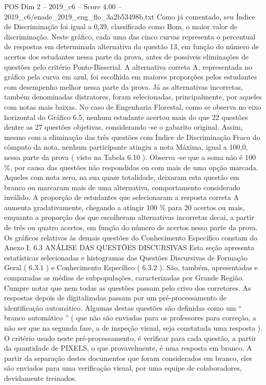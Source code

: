 \begin{textsample}{POS Dim 2 – 2019\_c6 – Score 4.00 – 2019\_c6/enade\_2019\_eng\_flo\_3a2b53498b.txt}
Como já comentado, seu Índice de Discriminação foi igual a 0,39, classificado como Bom, o maior valor de discriminação.
Neste gráfico, cada uma das cinco curvas representa o percentual de respostas em determinada alternativa da questão 13, em função do número de acertos dos estudantes nessa parte da prova, antes de possíveis eliminações de questões pelo critério Ponto-Bisserial.
A alternativa correta A, representada no gráfico pela curva em azul, foi escolhida em maiores proporções pelos estudantes com desempenho melhor nessa parte da prova.
Já as alternativas incorretas, também denominadas distratores, foram selecionadas, principalmente, por aqueles com notas mais baixas.
No caso de Engenharia Florestal, como se observa no eixo horizontal do Gráfico 6.5, nenhum estudante acertou mais do que 22 questões dentre as 27 questões objetivas, considerando -se o gabarito original.
Assim, mesmo com a eliminação das três questões com Índice de Discriminação Fraco do cômputo da nota, nenhum participante atingiu a nota Máxima, igual a 100,0, nessa parte da prova ( visto na Tabela 6.10 ).
Observa -se que a soma não é 100 \%, por causa das questões não respondidas ou com mais de uma opção marcada.
Aqueles com nota zero, na sua quase totalidade, deixaram esta questão em branco ou marcaram mais de uma alternativa, comportamento considerado inválido.
A proporção de estudantes que selecionaram a resposta correta A aumenta gradativamente, chegando a atingir 100 \% para 20 acertos ou mais, enquanto a proporção dos que escolheram alternativas incorretas decai, a partir de três ou quatro acertos, em função do número de acertos nessa parte da prova.
Os gráficos relativos às demais questões do Conhecimento Específico constam do Anexo I. 6.3 ANÁLISE DAS QUESTÕES DISCURSIVAS Esta seção apresenta estatísticas selecionadas e histogramas das Questões Discursivas de Formação Geral ( 6.3.1 ) e Conhecimento Específico ( 6.3.2 ).
São, também, apresentadas e comparadas as médias de subpopulações, caracterizadas por Grande Região.
Cumpre notar que nem todas as questões passam pelo crivo dos corretores.
As respostas depois de digitalizadas passam por um pré-processamento de identificação automático.
Algumas destas questões são definidas como um “ branco automático ” ( que não são enviadas para os professores para correção, a não ser que na segunda fase, a de inspeção visual, seja constatada uma resposta ).
O critério usado neste pré-processamento, é verificar para cada questão, a partir da quantidade de PIXELS, o que provavelmente, é uma resposta em branco.
A partir da separação destes documentos que foram considerados em branco, eles são enviados para uma verificação visual, por uma equipe de colaboradores, devidamente treinados.

\end{textsample}

